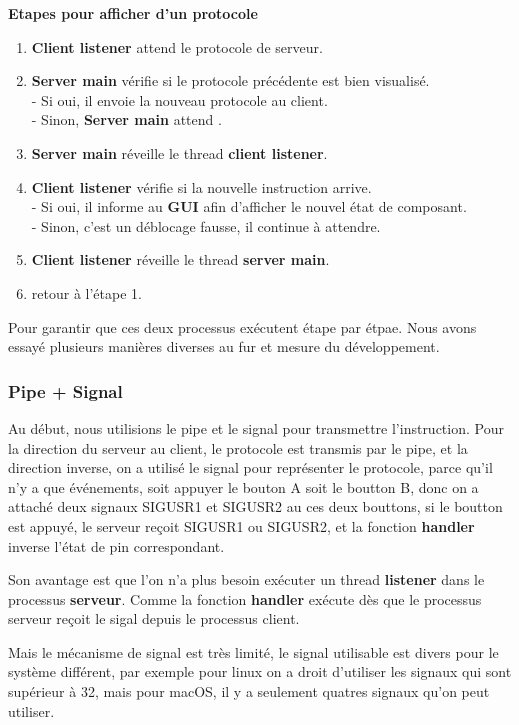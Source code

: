 \documentclass[14px]{article}
\begin{document}
\textbf{Etapes pour afficher d'un protocole}
\begin{enumerate}
	\item \textbf{Client listener} attend le protocole de serveur.
	\item \textbf{Server main} vérifie si le protocole précédente est bien visualisé.\\
	- Si oui, il envoie la nouveau protocole au client.\\
	- Sinon, \textbf{Server main} attend .
	\item \textbf{Server main} réveille le thread \textbf{client listener}.
	\item \textbf{Client listener} vérifie si la nouvelle instruction arrive.\\
	- Si oui, il informe au \textbf{GUI} afin d'afficher le nouvel état de composant.\\
	- Sinon, c'est un déblocage fausse, il continue à attendre.
	\item \textbf{Client listener} réveille le thread \textbf{server main}.
	\item retour à l'étape 1.
\end{enumerate}

Pour garantir que ces deux processus exécutent étape par étpae. Nous avons essayé plusieurs manières diverses au fur et mesure du développement.

\subsubsection{Pipe + Signal}
Au début, nous utilisions le pipe et le signal pour transmettre l'instruction. Pour la direction du serveur au client, le protocole est transmis par le pipe, et la direction inverse, on a utilisé le signal pour représenter le protocole, parce qu'il n'y a que événements, soit appuyer le bouton A soit le boutton B, donc on a attaché deux signaux SIGUSR1 et SIGUSR2 au ces deux bouttons, si le boutton est appuyé, le serveur reçoit SIGUSR1 ou SIGUSR2, et la fonction \textbf{handler} inverse l'état de pin correspondant.

Son avantage est que l'on n'a plus besoin exécuter un thread \textbf{listener} dans le processus \textbf{serveur}. Comme la fonction \textbf{handler} exécute dès que le processus serveur reçoit le sigal depuis le processus client. 

Mais le mécanisme de signal est très limité, le signal utilisable est divers pour le système différent, par exemple pour linux on a droit d'utiliser les signaux qui sont supérieur à 32, mais pour macOS, il y a seulement quatres signaux qu'on peut utiliser.
\end{document}
